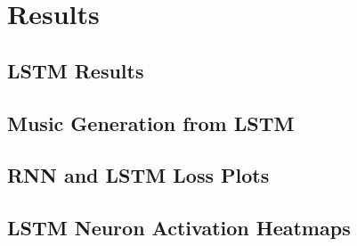 \section*{Results}


\subsection*{LSTM Results}


\subsection*{Music Generation from LSTM}

\subsection*{RNN and LSTM Loss Plots}

\subsection*{LSTM Neuron Activation Heatmaps}